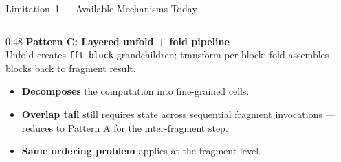 \documentclass[aspectratio=169,10pt]{beamer}
\newcommand{\good}[1]{\textcolor{green!50!black}{\textbf{#1}}}
\newcommand{\bad}[1]{\textcolor{red!70!black}{\textbf{#1}}}
\newcommand{\warn}[1]{\textcolor{orange!80!black}{\textbf{#1}}}
\newcommand{\code}[1]{\texttt{\small #1}}
\begin{document}
\begin{frame}[fragile]{Limitation~1 --- Available Mechanisms Today}
\begin{columns}[T]
\begin{column}{0.48\textwidth}
      \medskip
      \textbf{Pattern C: Layered unfold + fold pipeline} \\[2pt]
      \small
      Unfold creates \code{fft\_block} grandchildren; transform per
      block; fold assembles blocks back to fragment result.
      \begin{itemize}\tiny
        \item \good{Decomposes} the computation into fine-grained cells.
        \item \warn{Overlap tail} still requires state across sequential
              fragment invocations --- reduces to Pattern A for the
              inter-fragment step.
        \item \bad{Same ordering problem} applies at the fragment level.
      \end{itemize}
    \end{column}
  \end{columns}
\end{frame}

\end{document}
